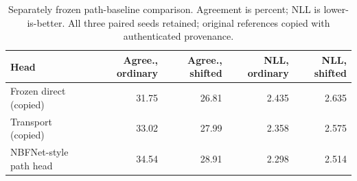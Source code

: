 \begin{table}[ht]
\centering\small
\caption{Separately frozen path-baseline comparison. Agreement is percent; NLL is lower-is-better. All three paired seeds retained; original references copied with authenticated provenance.\label{tab:path-baseline}}
\begin{tabular}{lrrrr}
\toprule
Head & Agree., ordinary & Agree., shifted & NLL, ordinary & NLL, shifted \\
\midrule
Frozen direct (copied) & 31.75 & 26.81 & 2.435 & 2.635 \\
Transport (copied) & 33.02 & 27.99 & 2.358 & 2.575 \\
NBFNet-style path head & 34.54 & 28.91 & 2.298 & 2.514 \\
\bottomrule
\end{tabular}
\end{table}
